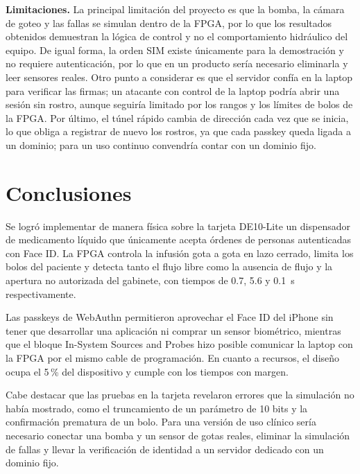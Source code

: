 \documentclass[11pt,letterpaper]{article}
\begin{document}
\textbf{Limitaciones.} La principal limitación del proyecto es que la bomba, la cámara de goteo y las fallas se simulan dentro de la FPGA, por lo que los resultados obtenidos demuestran la lógica de control y no el comportamiento hidráulico del equipo. De igual forma, la orden SIM existe únicamente para la demostración y no requiere autenticación, por lo que en un producto sería necesario eliminarla y leer sensores reales. Otro punto a considerar es que el servidor confía en la laptop para verificar las firmas; un atacante con control de la laptop podría abrir una sesión sin rostro, aunque seguiría limitado por los rangos y los límites de bolos de la FPGA. Por último, el túnel rápido cambia de dirección cada vez que se inicia, lo que obliga a registrar de nuevo los rostros, ya que cada passkey queda ligada a un dominio; para un uso continuo convendría contar con un dominio fijo.

\section{Conclusiones}\label{sec:conclusiones}
Se logró implementar de manera física sobre la tarjeta DE10-Lite un dispensador de medicamento líquido que únicamente acepta órdenes de personas autenticadas con Face ID. La FPGA controla la infusión gota a gota en lazo cerrado, limita los bolos del paciente y detecta tanto el flujo libre como la ausencia de flujo y la apertura no autorizada del gabinete, con tiempos de 0.7, 5.6 y 0.1~s respectivamente.

Las passkeys de WebAuthn permitieron aprovechar el Face ID del iPhone sin tener que desarrollar una aplicación ni comprar un sensor biométrico, mientras que el bloque In-System Sources and Probes hizo posible comunicar la laptop con la FPGA por el mismo cable de programación. En cuanto a recursos, el diseño ocupa el 5\,\% del dispositivo y cumple con los tiempos con margen.

Cabe destacar que las pruebas en la tarjeta revelaron errores que la simulación no había mostrado, como el truncamiento de un parámetro de 10 bits y la confirmación prematura de un bolo. Para una versión de uso clínico sería necesario conectar una bomba y un sensor de gotas reales, eliminar la simulación de fallas y llevar la verificación de identidad a un servidor dedicado con un dominio fijo.
\end{document}
